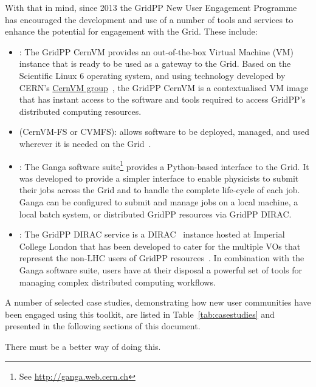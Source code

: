 \documentclass[12pt,a4paper]{iopart}
\begin{document}
%
With that in mind,
since 2013 the GridPP New User Engagement Programme has
encouraged the development and use of a number of tools and services
to enhance the potential for engagement with the Grid.
These include:

\begin{itemize}
%
\item {}: The GridPP CernVM provides an out-of-the-box
Virtual Machine (VM) instance that is ready to be used as a gateway to the Grid.
Based on the Scientific Linux 6 operating system,
and using technology developed by CERN's
\href{http://cernvm.cern.ch}{CernVM group}~\cite{CernVM2015},
the GridPP CernVM is a contextualised VM image that has instant access to
the software and tools required to access GridPP's distributed computing
resources.
%
\item {} (CernVM-FS or CVMFS): allows software to
be deployed, managed, and used wherever it is needed on the
Grid~\cite{CVMFS2015}.
%
\item {}: The Ganga software suite\footnote{%
See \href{http://ganga.web.cern.ch}{http://ganga.web.cern.ch}}
provides a Python-based interface to the Grid.
It was developed to provide a simpler interface to enable physicists to submit
their jobs across the Grid and to handle the complete life-cycle of each job.
Ganga can be configured to submit and manage jobs on a local machine,
a local batch system, or distributed GridPP resources via GridPP DIRAC.
%
\item {}: The GridPP DIRAC service is a
DIRAC~\cite{DIRAC2010}
instance hosted at Imperial College London that has been developed to cater
for the multiple VOs that represent the non-LHC users of
GridPP resources~\cite{GRIDPPDIRAC2015a,GRIDPPDIRAC2015b}.
%
In combination with the Ganga software suite,
users have at their disposal a
powerful set of tools for managing complex distributed computing workflows.
\end{itemize}

A number of selected case studies, demonstrating how new user
communities have been engaged using this toolkit,
are
listed in Table~\ref{tab:casestudies} and
presented in the following sections of this document.


\begin{landscape}
{\color{white} There must be a better way of doing this.}
\\[3cm]

\end{landscape}
\end{document}
